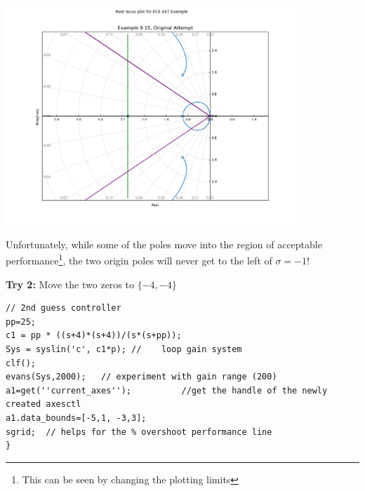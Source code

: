 \begin{ExampleCont}

\begin{center}
\includegraphics[width=110mm]{figs09/R15J18.png}
\end{center}

Unfortunately, while some of the poles move into the region of acceptable performance\footnote{This can be seen by changing the plotting limits},
the two origin poles will never get to the left of $\sigma = -1$!

\vspace{0.2in}
{\bf Try 2: } Move the two zeros to $\{-4,-4\}$
\begin{verbatim}
// 2nd guess controller
pp=25;
c1 = pp * ((s+4)*(s+4))/(s*(s+pp));
Sys = syslin('c', c1*p); //    loop gain system
clf();
evans(Sys,2000);   // experiment with gain range (200)
a1=get(''current_axes'');          //get the handle of the newly created axesctl
a1.data_bounds=[-5,1, -3,3];
sgrid;  // helps for the % overshoot performance line
}
\end{verbatim}

\end{ExampleCont}

